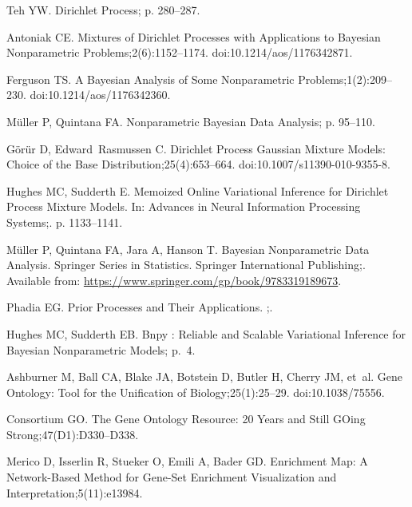 \documentclass[10pt,letterpaper]{article}
\begin{document}
\begin{thebibliography}{10}
	Teh YW.
	\newblock Dirichlet Process; p. 280--287.
	
	Antoniak CE.
	\newblock Mixtures of {{Dirichlet Processes}} with {{Applications}} to
	{{Bayesian Nonparametric Problems}};2(6):1152--1174.
	\newblock doi:{10.1214/aos/1176342871}.
	
	Ferguson TS.
	\newblock A {{Bayesian Analysis}} of {{Some Nonparametric
			Problems}};1(2):209--230.
	\newblock doi:{10.1214/aos/1176342360}.
	
	Müller P, Quintana FA.
	\newblock Nonparametric Bayesian Data Analysis; p. 95--110.
	
	Görür D, Edward~Rasmussen C.
	\newblock Dirichlet {{Process Gaussian Mixture Models}}: {{Choice}} of the
	{{Base Distribution}};25(4):653--664.
	\newblock doi:{10.1007/s11390-010-9355-8}.
	
	Hughes MC, Sudderth E.
	\newblock Memoized Online Variational Inference for {{Dirichlet}} Process
	Mixture Models.
	\newblock In: Advances in Neural Information Processing Systems;. p.
	1133--1141.
	
	Müller P, Quintana FA, Jara A, Hanson T.
	\newblock Bayesian {{Nonparametric Data Analysis}}.
	\newblock Springer {{Series}} in {{Statistics}}. {Springer International
		Publishing};.
	\newblock Available from: \url{https://www.springer.com/gp/book/9783319189673}.
	
	Phadia EG.
	\newblock Prior Processes and Their Applications.
	;.
	
	Hughes MC, Sudderth EB.
	\newblock Bnpy : {{Reliable}} and Scalable Variational Inference for
	{{Bayesian}} Nonparametric Models; p.~4.
	
	Ashburner M, Ball CA, Blake JA, Botstein D, Butler H, Cherry JM, et~al.
	\newblock Gene {{Ontology}}: Tool for the Unification of Biology;25(1):25--29.
	\newblock doi:{10.1038/75556}.
	
	Consortium GO.
	\newblock The Gene Ontology Resource: 20 Years and Still {{GOing}}
	Strong;47(D1):D330--D338.
	
	Merico D, Isserlin R, Stueker O, Emili A, Bader GD.
	\newblock Enrichment Map: A Network-Based Method for Gene-Set Enrichment
	Visualization and Interpretation;5(11):e13984.
	

\end{thebibliography}
\end{document}
